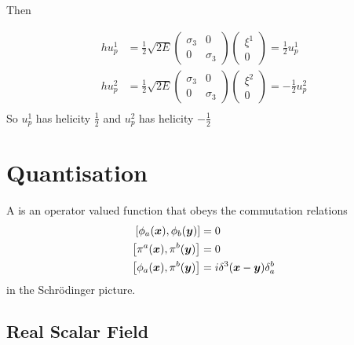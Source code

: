 \documentclass{article}
\begin{document}
\begin{example}
Then

\begin{align*}
    h u_p^1 &= \frac{1}{2} \sqrt{2E} \begin{pmatrix} \sigma_3 & 0 \\ 0 & \sigma_3 \end{pmatrix} \begin{pmatrix} \xi^1 \\ 0 \end{pmatrix} = \frac{1}{2} u_p^1 \\
     h u_p^2 &= \frac{1}{2} \sqrt{2E} \begin{pmatrix} \sigma_3 & 0 \\ 0 & \sigma_3 \end{pmatrix} \begin{pmatrix} \xi^2 \\ 0 \end{pmatrix} = -\frac{1}{2} u_p^2 \\
\end{align*}
So $u_p^1$ has helicity $\frac{1}{2}$ and $u_p^2$ has helicity $-\frac{1}{2}$
\end{example}


\section{Quantisation}

\begin{definition}
A  is an operator valued function that obeys the commutation relations 
\begin{align*}
    \comm[\phi_a(\bm{x})]{\phi_b(\bm{y})} &= 0 \\
    \comm[\pi^a(\bm{x})]{\pi^b(\bm{y})} &= 0 \\
    \comm[\phi_a(\bm{x})]{\pi^b(\bm{y})} &= i\delta^3(\bm{x}-\bm{y}) \delta_a^b
\end{align*}
in the Schr\"odinger picture. 
\end{definition}

\subsection{Real Scalar Field}
\end{document}

